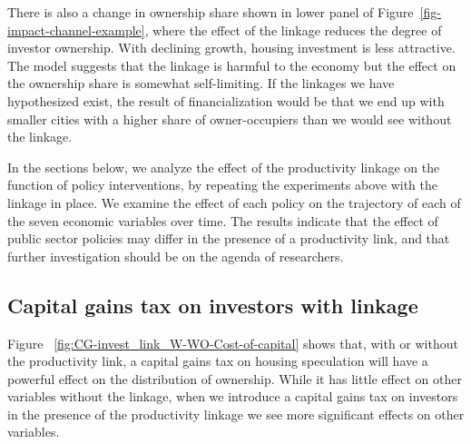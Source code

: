 There is also a change in ownership share shown in lower panel of Figure~\ref{fig-impact-channel-example}, where the effect of the linkage reduces the degree of investor ownership. With declining growth, housing investment is less attractive. The model suggests that the linkage is harmful to the economy but the effect on the ownership share is somewhat self-limiting.  If the linkages we have hypothesized exist, the result of financialization would be that we end up with smaller cities with a higher share of owner-occupiers than we would see without the linkage. %

In the sections below, we analyze the effect of the productivity linkage on the function of policy interventions, by repeating the experiments above with the linkage in place.  %
We examine the effect of each policy 
on the trajectory of each of the seven economic variables over time. The results indicate that the effect of public sector policies may differ in the presence of a productivity link, and that further investigation should be on the agenda of researchers. %


\newpage

\subsection{Capital gains tax on investors with linkage} \label{subsec:CGinvest}


Figure ~\ref{fig:CG-invest_link_W-WO-Cost-of-capital} shows that, with or without the productivity link, a capital gains tax on housing speculation will have a powerful effect on the distribution of ownership. While it has little effect on other variables without the linkage, when we introduce a capital gains tax on investors in the presence of the productivity linkage %
we see more significant effects on other variables.

